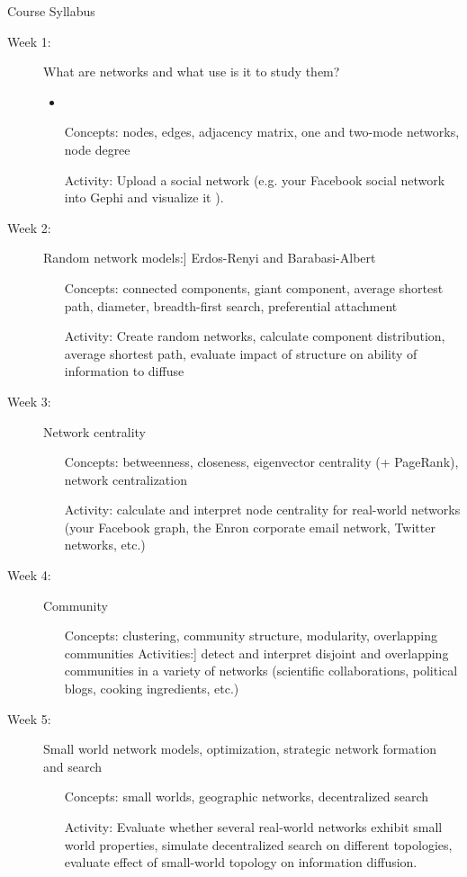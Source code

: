 \documentclass[11pt]{article} %
\begin{document}
Course Syllabus

\begin{description}
\item [Week 1:] What are networks and what use is it to study them?
\begin{itemize}
\item\item[Concepts:] nodes, edges, adjacency matrix, one and two-mode networks, node degree
\item[Activity:] Upload a social network (e.g. your Facebook social network into Gephi and visualize it ).
\end{itemize}

\item [Week 2:] Random network models:] Erdos-Renyi and Barabasi-Albert
\begin{itemize}\item[Concepts:] connected components, giant component, average shortest path, diameter, breadth-first search, preferential attachment
\item[Activity:] Create random networks, calculate component distribution, average shortest path, evaluate impact of structure on ability of information to diffuse
\end{itemize}

\item [Week 3:] Network centrality
\begin{itemize}\item[Concepts:] betweenness, closeness, eigenvector centrality (+ PageRank), network centralization
\item[Activity:] calculate and interpret node centrality for real-world networks (your Facebook graph, the Enron corporate email network, Twitter networks, etc.)
\end{itemize}

\item [Week 4:] Community
\begin{itemize}\item[Concepts:] clustering, community structure, modularity, overlapping communities
Activities:] detect and interpret disjoint and overlapping communities in a variety of networks (scientific collaborations, political blogs, cooking ingredients, etc.)
\end{itemize}

\item [Week 5:] Small world network models, optimization, strategic network formation and search
\begin{itemize}\item[Concepts:] small worlds, geographic networks, decentralized search
\item[Activity:] Evaluate whether several real-world networks exhibit small world properties, simulate decentralized search on different topologies, evaluate effect of small-world topology on information diffusion.
\end{itemize}




\end{description}
\end{document}
